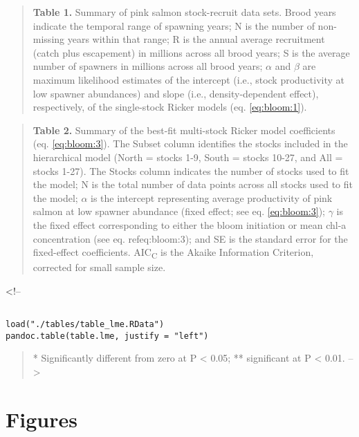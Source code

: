 \begin{quote}
\textbf{Table 1.} Summary of pink salmon stock-recruit data sets. Brood
years indicate the temporal range of spawning years; N is the number of
non-missing years within that range; R is the annual average recruitment
(catch plus escapement) in millions across all brood years; S is the
average number of spawners in millions across all brood years;
\(\alpha\) and \(\beta\) are maximum likelihood estimates of the
intercept (i.e., stock productivity at low spawner abundances) and slope
(i.e., density-dependent effect), respectively, of the single-stock
Ricker models (eq. \ref{eq:bloom:1}).
\end{quote}

\newpage

\begin{quote}
\textbf{Table 2.} Summary of the best-fit multi-stock Ricker model
coefficients (eq. \ref{eq:bloom:3}). The Subset column identifies the stocks included
in the hierarchical model (North = stocks 1-9, South = stocks 10-27, and
All = stocks 1-27). The Stocks column indicates the number of stocks
used to fit the model; N is the total number of data points across all
stocks used to fit the model; \(\alpha\) is the intercept representing
average productivity of pink salmon at low spawner abundance (fixed
effect; see eq. \ref{eq:bloom:3}); \(\gamma\) is the fixed effect corresponding to
either the bloom initiation or mean chl-a concentration (see eq. ref{eq:bloom:3}); and
SE is the standard error for the fixed-effect coefficients.
AIC\textsubscript{C} is the Akaike Information Criterion, corrected for
small sample size.
\end{quote}

\textless{}!--

\begin{verbatim}

load("./tables/table_lme.RData")
pandoc.table(table.lme, justify = "left")
\end{verbatim}

\begin{quote}
* Significantly different from zero at P \textless{} 0.05; **
significant at P \textless{} 0.01. --\textgreater{}
\end{quote}

\newpage

\section{Figures}


